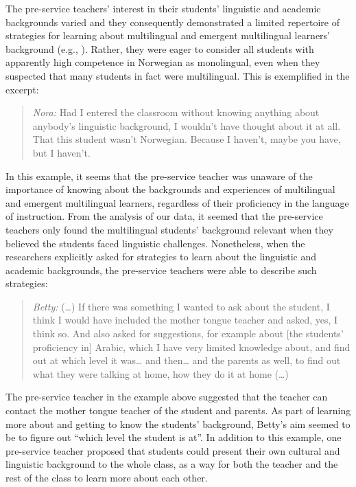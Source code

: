 \documentclass[output=paper]{langscibook}
\begin{document}
The pre-service teachers’ interest in their students’ linguistic and academic backgrounds varied and they consequently demonstrated a limited repertoire of strategies for learning about multilingual and emergent multilingual learners’ background (e.g., \citealt{LucasVillegas2013}). Rather, they were eager to consider all students with apparently high competence in Norwegian as monolingual, even when they suspected that many students in fact were multilingual. This is exemplified in the excerpt:

\begin{quote}
\emph{Nora:} Had I entered the classroom without knowing anything about anybody’s linguistic background, I wouldn’t have thought about it at all. That this student wasn’t Norwegian. Because I haven’t, maybe you have, but I haven’t. 
\end{quote}

\begin{sloppypar}
In this example, it seems that the pre-service teacher was unaware of the importance of knowing about the backgrounds and experiences of multilingual and emergent multilingual learners, regardless of their proficiency in the language of instruction. From the analysis of our data, it seemed that the pre-service teachers only found the multilingual students’ background relevant when they believed the students faced linguistic challenges. Nonetheless, when the researchers explicitly asked for strategies to learn about the linguistic and academic backgrounds, the pre-service teachers were able to describe such strategies: 
\end{sloppypar}

\begin{quote}
\emph{Betty:} (…) If there was something I wanted to ask about the student, I think I would have included the mother tongue teacher and asked, yes, I think so. And also asked for suggestions, for example about [the students’ proficiency in] Arabic, which I have very limited knowledge about, and find out at which level it was… and then… and the parents as well, to find out what they were talking at home, how they do it at home (…)
\end{quote}

The pre-service teacher in the example above suggested that the teacher can contact the mother tongue teacher of the student and parents. As part of learning more about and getting to know the students’ background, Betty’s aim seemed to be to figure out “which level the student is at”. In addition to this example, one pre-service teacher proposed that students could present their own cultural and linguistic background to the whole class, as a way for both the teacher and the rest of the class to learn more about each other. 
\end{document}
